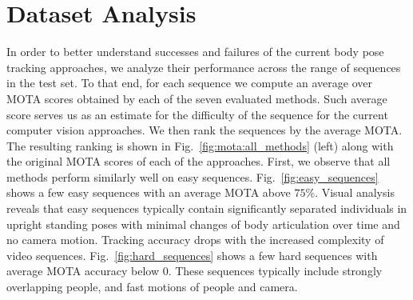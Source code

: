 \documentclass[10pt,twocolumn,letterpaper]{article}
\begin{document}
 












 \section{Dataset Analysis}
\label{sec:baselines}


In order to better understand successes and failures of the current body pose
tracking approaches, we analyze their performance across the range of
sequences in the test set. To that end, for each sequence we compute an average
over MOTA scores obtained by each of the seven evaluated methods. Such average
score serves us as an estimate for the difficulty of the sequence for the
current computer vision approaches. We then rank the sequences by the average
MOTA. The resulting ranking is shown in Fig.~\ref{fig:mota:all_methods} (left) along
with the original MOTA scores of each of the approaches.
First, we observe that all methods
perform similarly well on easy
sequences. Fig.~\ref{fig:easy_sequences} shows a few easy sequences
with an average MOTA above $75\%$. Visual analysis
reveals that easy sequences typically contain significantly separated
individuals in upright standing poses with minimal changes of body
articulation over time and no camera motion. Tracking accuracy drops
 with the increased complexity of video
sequences. Fig.~\ref{fig:hard_sequences} shows a few hard sequences
with average MOTA accuracy below $0$. 
These sequences typically include strongly overlapping people, and fast motions of
people and camera.
\end{document}
